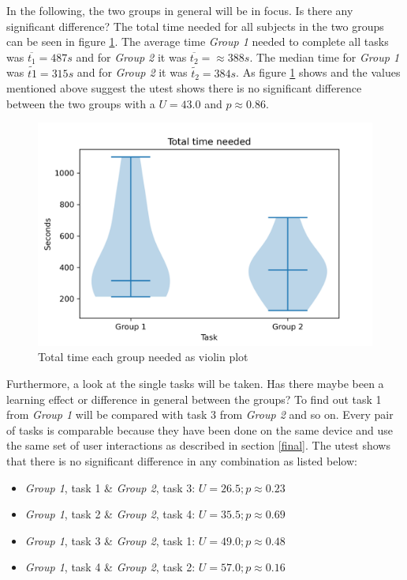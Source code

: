 In the following, the two groups in general will be in focus.
Is there any significant difference?
The total time needed for all subjects in the two groups can be seen in figure \ref{fig:group_time_violin}.
The average time \textit{Group 1} needed to complete all tasks was $\overline{t_1} = 487s$ and for \textit{Group 2} it was $\overline{t_2} = \approx388s$.
The median time for \textit{Group 1} was $\widetilde{t1} = 315s$ and for \textit{Group 2} it was $\widetilde{t_2} = 384s$.
As figure \ref{fig:group_time_violin} shows and the values mentioned above suggest the \gls{utest} shows there is no significant difference between the two groups with a $U = 43.0$ and $p \approx 0.86$.

\begin{figure}[htb]
  \centering
  \includegraphics*[width=1\textwidth]{Evaluation/img/group_time_violin.png}
  \caption{Total time each group needed as violin plot}
  \label{fig:group_time_violin}
\end{figure}

Furthermore, a look at the single tasks will be taken. 
Has there maybe been a learning effect or difference in general between the groups? 
To find out task 1 from \textit{Group 1} will be compared with task 3 from \textit{Group 2} and so on.
Every pair of tasks is comparable because they have been done on the same device and use the same set of user interactions as described in section \ref{final}.
The \gls{utest} shows that there is no significant difference in any combination as listed below:
\begin{itemize}
  \item \textit{Group 1}, task 1 \& \textit{Group 2}, task 3: $U = 26.5; p \approx 0.23$
  \item \textit{Group 1}, task 2 \& \textit{Group 2}, task 4: $U = 35.5; p \approx 0.69$
  \item \textit{Group 1}, task 3 \& \textit{Group 2}, task 1: $U = 49.0; p \approx 0.48$
  \item \textit{Group 1}, task 4 \& \textit{Group 2}, task 2: $U = 57.0; p \approx 0.16$
\end{itemize}

